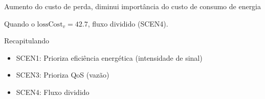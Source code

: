 
\begin{frame}
  Aumento do custo de perda, diminui importância do custo de consumo de energia
	\begin{figure}[!htb]
		\centering
		\quad %
	\end{figure}
  Quando o $\text{lossCost}_v = 42.7$, fluxo dividido (SCEN4).
\end{frame}

\begin{frame}
  \begin{block}{Recapitulando}
    \begin{itemize}
      \item SCEN1: Prioriza eficiência energética (intensidade de sinal)
      \item SCEN3: Prioriza QoS (vazão)
      \item SCEN4: Fluxo dividido
    \end{itemize}
  \end{block}
\end{frame}

